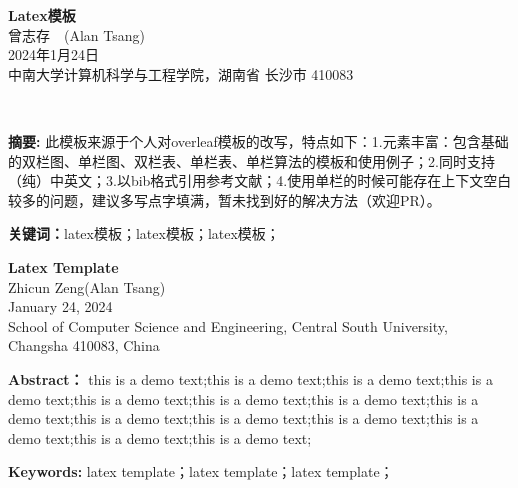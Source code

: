 \documentclass{template} %
\newcommand{\name}{曾志存}
\newcommand{\stuid}{Alan Tsang}
\newcommand{\Name}{Zhicun Zeng} %
\newcommand{\newtitle}{Latex模板}
\begin{document}
\begin{center}
 \textbf{\newtitle}\\
 \kaishu \name \ \ (\stuid)\\
 \kaishu 2024年1月24日\\中南大学计算机科学与工程学院，湖南省 长沙市 410083\\
\end{center} 

\textbf{摘\quad 要:}
此模板来源于个人对overleaf模板的改写，特点如下：1.元素丰富：包含基础的双栏图、单栏图、双栏表、单栏表、单栏算法的模板和使用例子；2.同时支持（纯）中英文；3.以bib格式引用参考文献；4.使用单栏的时候可能存在上下文空白较多的问题，建议多写点字填满，暂未找到好的解决方法（欢迎PR）。

\textbf{关键词：}latex模板；latex模板；latex模板；
~\\

\begin{center}
	 \textbf{Latex Template}\\
	 \Name\quad (\stuid)\\
	 January 24, 2024 \\ School of Computer Science and Engineering, Central South University, Changsha 410083, China
\end{center}

\textbf{Abstract：}
this is a demo text;this is a demo text;this is a demo text;this is a demo text;this is a demo text;this is a demo text;this is a demo text;this is a demo text;this is a demo text;this is a demo text;this is a demo text;this is a demo text;this is a demo text;this is a demo text;

\textbf{Keywords: }latex template；latex template；latex template；
\end{document}
